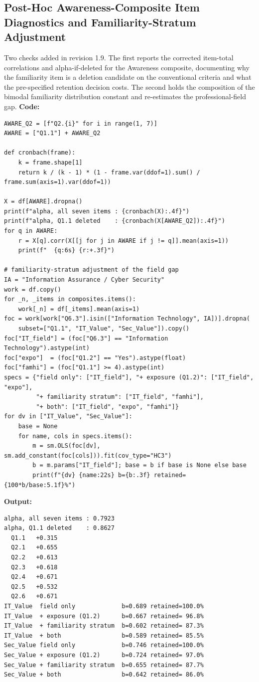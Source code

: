 \subsection{Post-Hoc Awareness-Composite Item Diagnostics and Familiarity-Stratum Adjustment}
Two checks added in revision 1.9. The first reports the corrected item-total correlations and alpha-if-deleted for the Awareness composite, documenting why the familiarity item is a deletion candidate on the conventional criteria and what the pre-specified retention decision costs. The second holds the composition of the bimodal familiarity distribution constant and re-estimates the professional-field gap.
\noindent\textbf{Code:}\nopagebreak
{\tiny\begin{verbatim}
AWARE_Q2 = [f"Q2.{i}" for i in range(1, 7)]
AWARE = ["Q1.1"] + AWARE_Q2

def cronbach(frame):
    k = frame.shape[1]
    return k / (k - 1) * (1 - frame.var(ddof=1).sum() / frame.sum(axis=1).var(ddof=1))

X = df[AWARE].dropna()
print(f"alpha, all seven items : {cronbach(X):.4f}")
print(f"alpha, Q1.1 deleted    : {cronbach(X[AWARE_Q2]):.4f}")
for q in AWARE:
    r = X[q].corr(X[[j for j in AWARE if j != q]].mean(axis=1))
    print(f"  {q:6s} {r:+.3f}")

# familiarity-stratum adjustment of the field gap
IA = "Information Assurance / Cyber Security"
work = df.copy()
for _n, _items in composites.items():
    work[_n] = df[_items].mean(axis=1)
foc = work[work["Q6.3"].isin(["Information Technology", IA])].dropna(
    subset=["Q1.1", "IT_Value", "Sec_Value"]).copy()
foc["IT_field"] = (foc["Q6.3"] == "Information Technology").astype(int)
foc["expo"]  = (foc["Q1.2"] == "Yes").astype(float)
foc["famhi"] = (foc["Q1.1"] >= 4).astype(int)
specs = {"field only": ["IT_field"], "+ exposure (Q1.2)": ["IT_field", "expo"],
         "+ familiarity stratum": ["IT_field", "famhi"],
         "+ both": ["IT_field", "expo", "famhi"]}
for dv in ["IT_Value", "Sec_Value"]:
    base = None
    for name, cols in specs.items():
        m = sm.OLS(foc[dv], sm.add_constant(foc[cols])).fit(cov_type="HC3")
        b = m.params["IT_field"]; base = b if base is None else base
        print(f"{dv} {name:22s} b={b:.3f} retained={100*b/base:5.1f}%")
\end{verbatim}}
\noindent\textbf{Output:}\nopagebreak
{\scriptsize\begin{verbatim}
alpha, all seven items : 0.7923
alpha, Q1.1 deleted    : 0.8627
  Q1.1   +0.315
  Q2.1   +0.655
  Q2.2   +0.613
  Q2.3   +0.618
  Q2.4   +0.671
  Q2.5   +0.532
  Q2.6   +0.671
IT_Value  field only             b=0.689 retained=100.0%
IT_Value  + exposure (Q1.2)      b=0.667 retained= 96.8%
IT_Value  + familiarity stratum  b=0.602 retained= 87.3%
IT_Value  + both                 b=0.589 retained= 85.5%
Sec_Value field only             b=0.746 retained=100.0%
Sec_Value + exposure (Q1.2)      b=0.724 retained= 97.0%
Sec_Value + familiarity stratum  b=0.655 retained= 87.7%
Sec_Value + both                 b=0.642 retained= 86.0%
\end{verbatim}}

